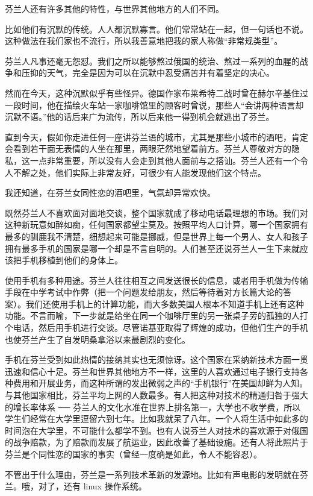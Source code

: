 芬兰人还有许多其他的特性，与世界其他地方的人们不同。

比如他们有沉默的传统。人人都沉默寡言。他们常常站在一起，但一句话也不说。这种做法在我们家也不流行，所以我善意地把我的家人称做“非常规类型”。

芬兰人凡事还毫无怨怼。我们之所以能够熬过俄国的统治、熬过一系列的血腥的战争和压抑的天气，完全是因为可以在沉默中忍受痛苦并有着坚定的决心。

然而在今天，这种沉默似乎有些怪异。德国作家布莱希特二战时曾在赫尔辛基住过一段时间，他在描绘火车站一家咖啡馆里的顾客时曾说，那些人“会讲两种语言却沉默不语。”他的话后来广为流传，所以后来他一得到机会就逃出了芬兰。

直到今天，假如你走进任何一座讲芬兰语的城市，尤其是那些小城市的酒吧，肯定会看到若干面无表情的人坐在那里，两眼茫然地望着前方。芬兰人尊敬对方的隐私，这一点非常重要，所以没有人会走到其他人面前与之搭讪。芬兰人还有一个令人不解之处，他们实际上非常友好，可很少有人能发现他们这个特点。

我还知道，在芬兰女同性恋的酒吧里，气氛却异常欢快。

既然芬兰人不喜欢面对面地交谈，整个国家就成了移动电话最理想的市场。我们对这种新玩意如醉如痴，任何国家都望尘莫及。按照平均人口计算，哪一个国家拥有最多的驯鹿我不清楚，细想起来可能是挪威，但是世界上每一个男人、女人和孩子拥有最多手机的国家是哪一个却是不言自明的。人们甚至还说芬兰人一生下来就应该把手机移植到他们的身体上。

使用手机有多种用途。芬兰人往往相互之间发送很长的信息，或者用手机做为传输手段在中学考试中作弊（把一个问题发给朋友，然后等待着对方长篇大论的答案）。我们还使用手机上的计算功能，而大多数美国人根本不知道手机上还有这种功能。不言而喻，下一步就是给坐在同一个咖啡厅里的另一张桌子旁的孤独的人打个电话，然后用手机进行交谈。尽管诺基亚取得了辉煌的成功，但他们生产的手机也使芬兰产生了自发明桑拿浴以来最剧烈的变化。

手机在芬兰受到如此热情的接纳其实也无须惊讶。这个国家在采纳新技术方面一贯迅速和信心十足。芬兰和世界其他地方不一样，这里的人喜欢通过电子银行支持各种费用和开展业务，而这种所谓的发出微弱之声的“手机银行”在美国却鲜为人知。与其他国家相比，芬兰平均上网的人数最多。有人把这种对技术的精通归咎于强大的增长率体系 ── 芬兰人的文化水准在世界上排名第一，大学也不收学费，所以学生们经常在大学里逗留六到七年。比如我就呆了八年。一个人将生活中如此多的时间泡在大学里，不可能什么都学不到。也有人说芬兰人对技术的喜欢源于对俄国的战争赔款，为了赔款而发展了航运业，因此改善了基础设施。还有人将此照片于芬兰是个同性恋的国家的事实（曾经一度确是如此，令人不能容忍）。

不管出于什么理由，芬兰是一系列技术革新的发源地。比如有声电影的发明就在芬兰。哦，对了，还有 linux 操作系统。

